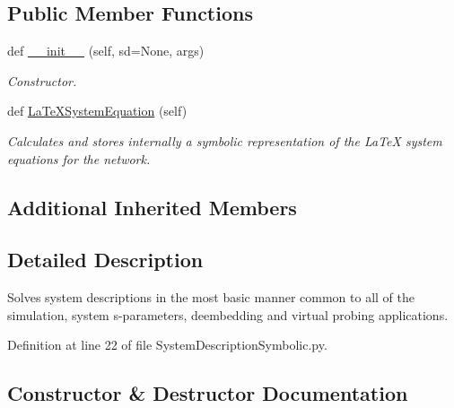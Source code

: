\subsection*{Public Member Functions}
\begin{DoxyCompactItemize}
\item 
def \hyperlink{classSignalIntegrity_1_1SystemDescriptions_1_1SystemDescriptionSymbolic_1_1SystemDescriptionSymbolic_a72fa31992e716f60779f561f6cdbb4ce}{\+\_\+\+\_\+init\+\_\+\+\_\+} (self, sd=None, args)
\begin{DoxyCompactList}\small\item\em Constructor. \end{DoxyCompactList}\item 
def \hyperlink{classSignalIntegrity_1_1SystemDescriptions_1_1SystemDescriptionSymbolic_1_1SystemDescriptionSymbolic_ab91378c2a97ec0d38ee1c70988142eb5}{La\+Te\+X\+System\+Equation} (self)
\begin{DoxyCompactList}\small\item\em Calculates and stores internally a symbolic representation of the La\+TeX system equations for the network. \end{DoxyCompactList}\end{DoxyCompactItemize}
\subsection*{Additional Inherited Members}


\subsection{Detailed Description}
Solves system descriptions in the most basic manner common to all of the simulation, system s-\/parameters, deembedding and virtual probing applications. 



Definition at line 22 of file System\+Description\+Symbolic.\+py.



\subsection{Constructor \& Destructor Documentation}
\mbox{\label{classSignalIntegrity_1_1SystemDescriptions_1_1SystemDescriptionSymbolic_1_1SystemDescriptionSymbolic_a72fa31992e716f60779f561f6cdbb4ce}} 
